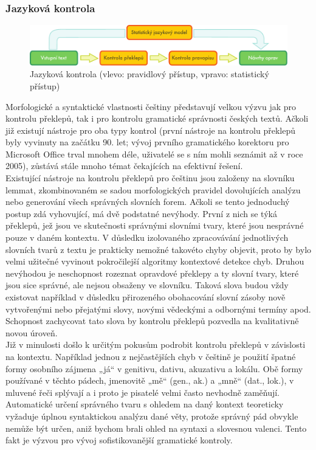 \documentclass[]{../../metanetpaper}
\begin{document}
\begin{multicols}{2}
\subsubsection{Jazyková kontrola}
\begin{figure}[t]
  \center
  \includegraphics[width=\textwidth]{../_media/czech/language_checking}
  \caption{Jazyková kontrola (vlevo: pravidlový přístup, vpravo: statistický přístup)}
  \label{fig:langcheckingaarch_en}
\end{figure}
Morfologické a syntaktické vlastnosti češtiny představují velkou výzvu jak pro kontrolu překlepů, tak i pro kontrolu gramatické správnosti českých textů. Ačkoli již existují nástroje pro oba typy kontrol (první nástroje na kontrolu překlepů byly vyvinuty na začátku 90. let; vývoj prvního gramatického korektoru pro Microsoft Office trval mnohem déle, uživatelé se s ním mohli seznámit až v roce 2005), zůstává stále mnoho témat čekajících na efektivní řešení.\\
Existující nástroje na kontrolu překlepů pro češtinu jsou založeny na slovníku lemmat, zkombinovaném se sadou morfologických pravidel dovolujících analýzu nebo generování všech správných slovních forem. Ačkoli se tento jednoduchý postup zdá vyhovující, má dvě podstatné nevýhody. První z nich se týká překlepů, jež jsou ve skutečnosti správnými slovními tvary, které jsou nesprávné pouze v daném kontextu. V důsledku izolovaného zpracovávání jednotlivých slovních tvarů z textu je prakticky nemožné takovéto chyby objevit, proto by bylo velmi užitečné vyvinout pokročilejší algoritmy kontextové detekce chyb. Druhou nevýhodou je neschopnost rozeznat opravdové překlepy a ty slovní tvary, které jsou sice správné, ale nejsou obsaženy ve slovníku. Taková slova budou vždy existovat například v důsledku přirozeného obohacování slovní zásoby nově vytvořenými nebo přejatými slovy, novými vědeckými a odbornými termíny apod. Schopnost zachycovat tato slova by kontrolu překlepů pozvedla na kvalitativně novou úroveň.\\
Již v minulosti došlo k určitým pokusům podrobit kontrolu překlepů v závislosti na kontextu. Například jednou z nejčastějších chyb v češtině je použití špatné formy osobního zájmena „já“ v genitivu, dativu, akuzativu a lokálu. Obě formy používané v těchto pádech, jmenovitě „mě“ (gen., ak.) a „mně“ (dat., lok.), v mluvené řeči splývají a i proto je pisatelé velmi často nevhodně zaměňují. Automatické určení správného tvaru s ohledem na daný kontext teoreticky vyžaduje úplnou syntaktickou analýzu dané věty, protože správný pád obvykle nemůže být určen, aniž bychom brali ohled na syntaxi a slovesnou valenci. Tento fakt je výzvou pro vývoj sofistikovanější gramatické kontroly.\\

\end{multicols}
\end{document}
